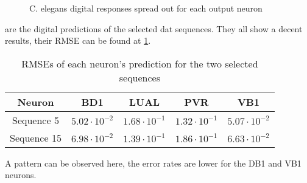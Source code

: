 \begin{figure}[H]
  \centering
  \begin{minipage}{\columnwidth}
    \hfill
  \end{minipage}
  \begin{minipage}{\columnwidth}
    \hfill
  \end{minipage}
  \caption{\ac{C. elegans} digital responses spread out for each output neuron}
  \label{graph:digital5Celegans}
\end{figure}

 are the digital predictions of the selected dat sequences. They all show a decent results, their \ac{RMSE} can be found at \cref{tab:celegansDigital}.

\begin{table}[H]
  \centering
  \begin{tabular}{|c|c|c|c|c|}
    \hline
    \rowcolor{gray}
    Neuron & BD1 & LUAL & PVR & VB1\\
    \hline
    Sequence 5 & $5.02\cdot 10^{-2}$ & $1.68\cdot 10^{-1}$ & $1.32\cdot 10^{-1}$ & $5.07\cdot 10^{-2}$\\
    \hline
    Sequence 15 & $6.98\cdot 10^{-2}$ & $1.39\cdot 10^{-1}$ & $1.86\cdot 10^{-1}$ & $6.63\cdot 10^{-2}$\\
    \hline
  \end{tabular}
  \caption{\acp{RMSE} of each neuron's prediction for the two selected sequences}
  \label{tab:celegansDigital}
\end{table}

A pattern can be observed here, the error rates are lower for the DB1 and VB1 neurons.

